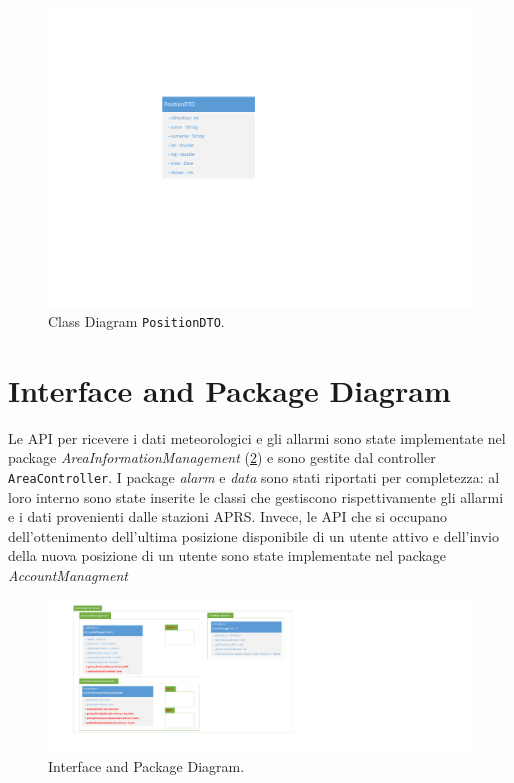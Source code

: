 \begin{figure}[h!]
	\centering
	\includegraphics[width=1\linewidth]{./Iterazione 3/OtherFiles/DTOSpecification}
	\caption{Class Diagram \texttt{PositionDTO}.}
	\label{fig:ClassDiagramDTO_iterazione3}
\end{figure}

\clearpage

\section{Interface and Package Diagram}
Le API per ricevere i dati meteorologici e gli allarmi sono state implementate nel package \textit{AreaInformationManagement} (\Fig\ref{fig:InterfaceDiagram_iterazione3}) e sono gestite dal controller \texttt{AreaController}. I package \textit{alarm} e \textit{data} sono stati riportati per completezza: al loro interno sono state inserite le classi che gestiscono rispettivamente gli allarmi e i dati provenienti dalle stazioni APRS. Invece, le API che si occupano dell'ottenimento dell'ultima posizione disponibile di un utente attivo e dell'invio della nuova posizione di un utente sono state implementate nel package \textit{AccountManagment}

\begin{figure}[h!]
	\centering
	\includegraphics[width=0.8\linewidth]{./Iterazione 3/OtherFiles/UML - Interface Diagram}
	\caption{Interface and Package Diagram.}
\label{fig:InterfaceDiagram_iterazione3}
\end{figure}
